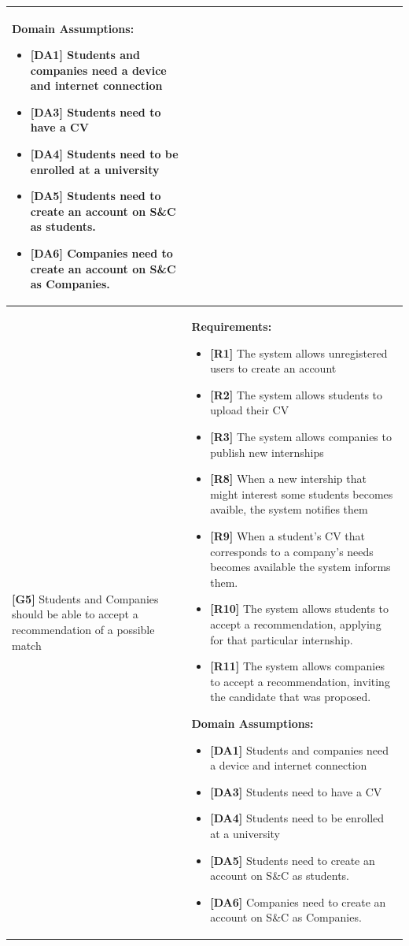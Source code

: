 \begin{longtable}{|p{}|p{}|}
\textbf{Domain Assumptions:}
\begin{itemize}
    \item \textbf{[DA1]} Students and companies need a device and internet connection
    \item \textbf{[DA3]} Students need to have a CV
     \item \textbf{[DA4]} Students need to be enrolled at a university
    \item \textbf{[DA5]} Students need to create an account on S\&C as students.
    \item \textbf{[DA6]} Companies need to create an account on S\&C as Companies.
\end{itemize} \\
\hline
\textbf{[G5]} Students and Companies should be able to accept a recommendation of a possible match
& 
\textbf{Requirements:}
\begin{itemize}
    \item \textbf{[R1]} The system allows unregistered users to create an account
    \item \textbf{[R2]} The system allows students to upload their CV
    \item \textbf{[R3]} The system allows companies to publish new internships
    \item  \textbf{[R8]} When a new intership that might interest some students becomes avaible, the system notifies them
    \item  \textbf{[R9]} When a student’s CV that corresponds to a company’s needs becomes available the system informs them.
    \item  \textbf{[R10]} The system allows students to accept a recommendation, applying for that particular internship.
    \item  \textbf{[R11]} The system allows companies to accept a recommendation, inviting the candidate that was proposed.
\end{itemize}
\textbf{Domain Assumptions:}
\begin{itemize}
     \item \textbf{[DA1]} Students and companies need a device and internet connection
     \item \textbf{[DA3]} Students need to have a CV
     \item \textbf{[DA4]} Students need to be enrolled at a university
    \item \textbf{[DA5]} Students need to create an account on S\&C as students.
    \item \textbf{[DA6]} Companies need to create an account on S\&C as Companies.

\end{itemize}
\end{longtable}
